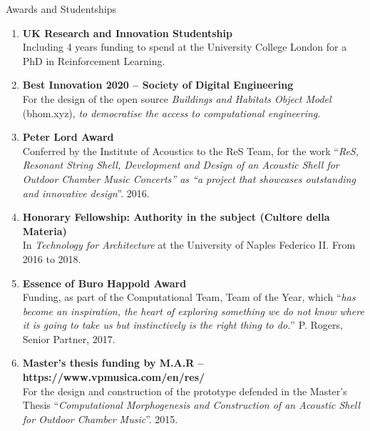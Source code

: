 \documentclass{resume}
\begin{document}
    \begin{rSection}{Awards and Studentships}
    \begin{enumerate}[leftmargin=0.45cm, itemsep=0em, topsep=0.5em, parsep=0.2em]
        \item
        \textbf{UK Research and Innovation Studentship} \\
        Including 4 years funding to spend at the University College London for a PhD in Reinforcement Learning.
        \item
        \textbf{Best Innovation 2020 – Society of Digital Engineering} \\
        For the design of the open source \textit{Buildings and Habitats Object Model} (bhom.xyz), \textit{to democratise the access to computational engineering}.
        \item
        \textbf{Peter Lord Award} \\
        Conferred by the Institute of Acoustics to the ReS Team, for the work “\textit{ReS, Resonant String Shell, Development and Design of an Acoustic Shell for Outdoor Chamber Music Concerts” as “a project that showcases outstanding and innovative design}”. 2016.
        \item
        \textbf{Honorary Fellowship: Authority in the subject (Cultore della Materia)} \\
        In \textit{Technology for Architecture} at the University of Naples Federico II.
        From 2016 to 2018.
        \item
        \textbf{Essence of Buro Happold Award} \\
        Funding, as part of the Computational Team, Team of the Year, which “\textit{has become an inspiration, the heart of exploring something we do not know where it is going to take us but instinctively is the right thing to do.}” P. Rogers, Senior Partner, 2017.
        \item
        \textbf{Master’s thesis funding by M.A.R – https://www.vpmusica.com/en/res/}  \\
    For the design and construction of the prototype defended in the Master’s Thesis “\textit{Computational Morphogenesis and Construction of an Acoustic Shell for Outdoor Chamber Music}”. 2015.
    \end{enumerate}
\end{rSection}
\end{document}
